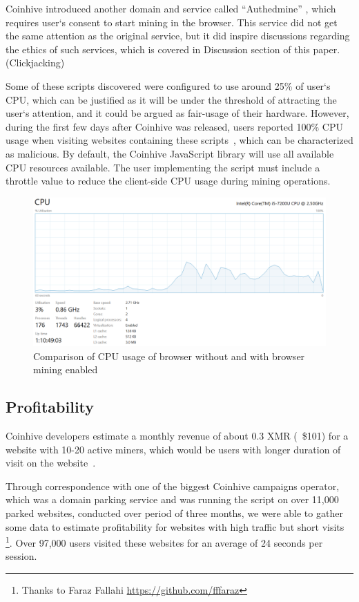 Coinhive introduced another domain and service called ``Authedmine'' , which requires user`s consent to start mining in the browser. This service did not get the same attention as the original service, but it did inspire discussions regarding the ethics of such services, which is covered in Discussion section of this paper. (Clickjacking) 

Some of these scripts discovered were configured to use around 25\% of user`s CPU, which can be justified as it will be under the threshold of attracting the user`s attention, and it could be argued as fair-usage of their hardware. However, during the first few days after Coinhive was released, users reported 100\% CPU usage when visiting websites containing these scripts~\cite{piratesbayblog}, which can be characterized as malicious. By default, the Coinhive JavaScript library will use all available CPU resources available. The user implementing the script must include a throttle value to reduce the client-side CPU usage during mining operations.

\begin{figure}[t]
\centering
\includegraphics[width=\linewidth]{figures/windows_cpu_usage.png}
	\caption{Comparison of CPU usage of browser without and with browser mining enabled}
\end{figure}

\subsection{Profitability}
\label{profitabilitexperiment}

Coinhive developers estimate a monthly revenue of about 0.3 XMR (~\$101) for a website with 10-20 active miners, which would be users with longer duration of visit on the website~\cite{coinhive}.

Through correspondence with one of the biggest Coinhive campaigns operator, which was a domain parking service and was running the script on over 11,000 parked websites, conducted over period of three months, we were able to gather some data to estimate profitability for websites with high traffic but short visits \footnote{Thanks to Faraz Fallahi \url{https://github.com/fffaraz}}. Over 97,000 users visited these websites for an average of 24 seconds per session.

